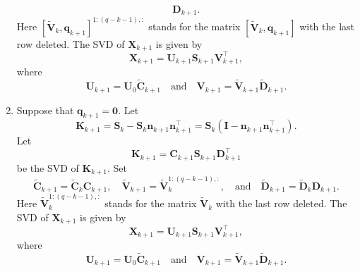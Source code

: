 \documentclass[11pt,a4paper]{article}
\theoremstyle{mybreak}
\numberwithin{dummy}{section}
\theoremstyle{plain}
\theoremstyle{plain}
\theoremstyle{plain}
\theoremstyle{plain}
\theoremstyle{MyNonumberplain}
\DeclareMathOperator*{\diag}{diag}
\newcommand{\0}{\M{0}}
\newcommand{\M}[1]{\mathbf{#1}}
\newcommand{\Mt}[1]{\tilde{\M{#1}}}
\newcommand{\T}{\top}
\newcommand{\ve}[1]{\mathbf{#1}}
\begin{document}
\begin{enumerate}[font=\upshape,label=(\roman*),wide,align=right]
\begin{displaymath}
    \M{D}_{k+1}.
  \end{displaymath}
  Here $[\Mt{V}_k, \ve{q}_{k+1}]^{1:(q - k - 1),:}$ stands for the matrix $[\Mt{V}_k, \ve{q}_{k+1}]$ with the last row deleted.  The SVD of $\M{X}_{k+1}$ is given by
  \begin{displaymath}
    \M{X}_{k+1} = \M{U}_{k+1} \M{S}_{k+1}\M{V}_{k+1}^\T,
  \end{displaymath}
  where
  \begin{displaymath}
    \M{U}_{k+1} = \M{U}_0 \Mt{C}_{k+1}
    \quad
    \text{and}
    \quad
    \M{V}_{k+1} = \Mt{V}_{k+1} \Mt{D}_{k+1}.
  \end{displaymath}
\item Suppose that $\ve{q}_{k+1} =\0$. Let
  \begin{displaymath}
    \M{K}_{k+1}
    = \M{S}_k - \M{S}_k \ve{n}_{k+1} \ve{n}_{k+1}^\T
    = \M{S}_k \left( \M{I} - \ve{n}_{k+1} \ve{n}_{k+1}^\T \right).
  \end{displaymath}
  Let
  \begin{displaymath}
    \M{K}_{k+1} = \M{C}_{k+1} \M{S}_{k+1}  \M{D}_{k+1}^\T
  \end{displaymath}
  be the SVD of $\M{K}_{k+1}$.  Set
  \begin{displaymath}
    \Mt{C}_{k+1} = \Mt{C}_k \M{C}_{k+1},
    \quad
    \Mt{V}_{k+1}
    =
    \Mt{V}_k^{1:(q-k-1),:},
    \quad
    \text{and}
    \quad
    \Mt{D}_{k+1}
    = \Mt{D}_k \M{D}_{k+1}.
  \end{displaymath}
  Here $\Mt{V}_k^{1:(q - k - 1),:}$ stands for the matrix $\Mt{V}_k$ with the last row deleted.  The SVD of $\M{X}_{k+1}$ is given by
  \begin{displaymath}
    \M{X}_{k+1} = \M{U}_{k+1} \M{S}_{k+1}\M{V}_{k+1}^\T,
  \end{displaymath}
  where
  \begin{displaymath}
    \M{U}_{k+1} = \M{U}_0 \Mt{C}_{k+1}
    \quad
    \text{and}
    \quad
    \M{V}_{k+1} = \Mt{V}_{k+1} \Mt{D}_{k+1}.
  \end{displaymath}

\end{enumerate}

\end{document}
